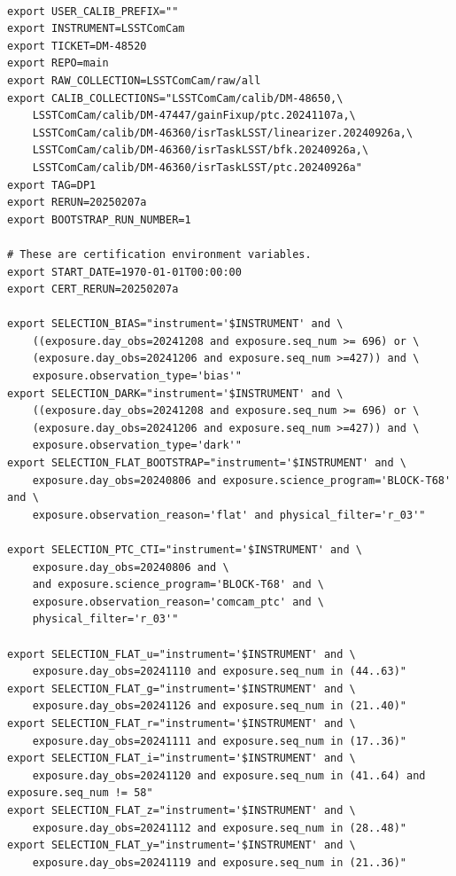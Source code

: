 \documentclass[DM,authoryear,toc]{lsstdoc}
\begin{document}
\begin{footnotesize}
\begin{verbatim}

export USER_CALIB_PREFIX=""
export INSTRUMENT=LSSTComCam
export TICKET=DM-48520
export REPO=main
export RAW_COLLECTION=LSSTComCam/raw/all
export CALIB_COLLECTIONS="LSSTComCam/calib/DM-48650,\
    LSSTComCam/calib/DM-47447/gainFixup/ptc.20241107a,\
    LSSTComCam/calib/DM-46360/isrTaskLSST/linearizer.20240926a,\
    LSSTComCam/calib/DM-46360/isrTaskLSST/bfk.20240926a,\
    LSSTComCam/calib/DM-46360/isrTaskLSST/ptc.20240926a"
export TAG=DP1
export RERUN=20250207a
export BOOTSTRAP_RUN_NUMBER=1

# These are certification environment variables.
export START_DATE=1970-01-01T00:00:00
export CERT_RERUN=20250207a

export SELECTION_BIAS="instrument='$INSTRUMENT' and \
    ((exposure.day_obs=20241208 and exposure.seq_num >= 696) or \
    (exposure.day_obs=20241206 and exposure.seq_num >=427)) and \
    exposure.observation_type='bias'"
export SELECTION_DARK="instrument='$INSTRUMENT' and \
    ((exposure.day_obs=20241208 and exposure.seq_num >= 696) or \
    (exposure.day_obs=20241206 and exposure.seq_num >=427)) and \
    exposure.observation_type='dark'"
export SELECTION_FLAT_BOOTSTRAP="instrument='$INSTRUMENT' and \
    exposure.day_obs=20240806 and exposure.science_program='BLOCK-T68' and \
    exposure.observation_reason='flat' and physical_filter='r_03'"

export SELECTION_PTC_CTI="instrument='$INSTRUMENT' and \
    exposure.day_obs=20240806 and \
    and exposure.science_program='BLOCK-T68' and \
    exposure.observation_reason='comcam_ptc' and \
    physical_filter='r_03'"

export SELECTION_FLAT_u="instrument='$INSTRUMENT' and \
    exposure.day_obs=20241110 and exposure.seq_num in (44..63)"
export SELECTION_FLAT_g="instrument='$INSTRUMENT' and \
    exposure.day_obs=20241126 and exposure.seq_num in (21..40)"
export SELECTION_FLAT_r="instrument='$INSTRUMENT' and \
    exposure.day_obs=20241111 and exposure.seq_num in (17..36)"
export SELECTION_FLAT_i="instrument='$INSTRUMENT' and \
    exposure.day_obs=20241120 and exposure.seq_num in (41..64) and exposure.seq_num != 58"
export SELECTION_FLAT_z="instrument='$INSTRUMENT' and \
    exposure.day_obs=20241112 and exposure.seq_num in (28..48)"
export SELECTION_FLAT_y="instrument='$INSTRUMENT' and \
    exposure.day_obs=20241119 and exposure.seq_num in (21..36)"


\end{verbatim}
\end{footnotesize}
\end{document}
